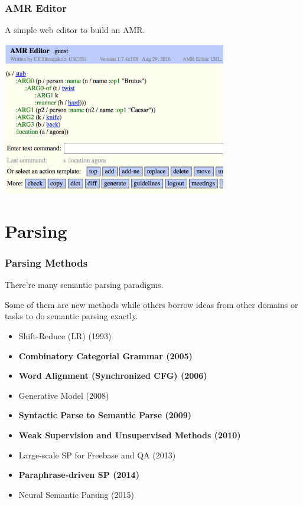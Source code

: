 \documentclass{beamer}
\begin{document}
\begin{frame}
    \frametitle{AMR Editor}

    A simple web editor to build an AMR.

    \begin{center}
        \includegraphics[height=6.7cm,width=9.8cm]{img/amr-editor.png}
    \end{center}
\end{frame}

\section{Parsing}

\begin{frame}
    \frametitle{Parsing Methods}

    There're many semantic parsing paradigms.

    Some of them are new methods while others borrow ideas from other domains or
    tasks to do semantic parsing exactly.

    \begin{itemize}
        \item Shift-Reduce (LR) (1993)
        \item {\bf Combinatory Categorial Grammar (2005)}
        \item {\bf Word Alignment (Synchronized CFG) (2006)}
        \item Generative Model (2008)
        \item {\bf Syntactic Parse to Semantic Parse (2009)}
        \item {\bf Weak Supervision and Unsupervised Methods (2010)}
        \item Large-scale SP for Freebase and QA (2013)
        \item {\bf Paraphrase-driven SP (2014)}
        \item Neural Semantic Parsing (2015)
    \end{itemize}

\end{frame}
\end{document}
